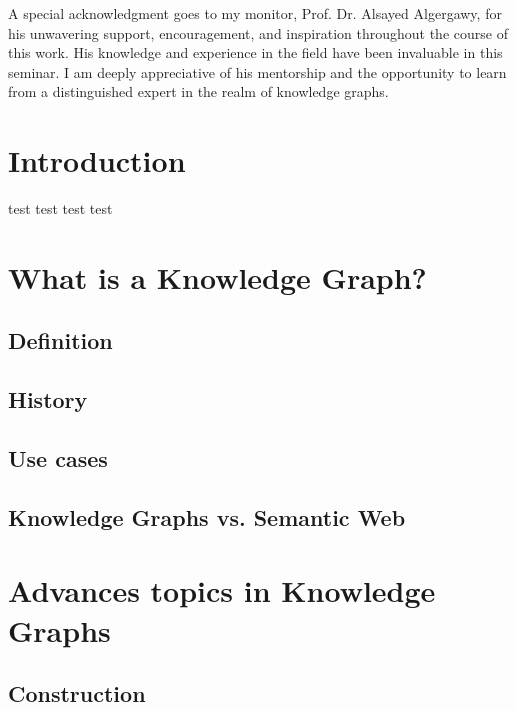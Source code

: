 \documentclass[12pt]{article} %
\begin{document}
A special acknowledgment goes to my monitor, Prof. Dr. Alsayed Algergawy, for his unwavering support, encouragement, and inspiration throughout the course of this work. His knowledge and experience in the field have been invaluable in this seminar. I am deeply appreciative of his mentorship and the opportunity to learn from a distinguished expert in the realm of knowledge graphs.

\newpage

\tableofcontents
\listoffigures
\listoftables
\newpage

\section{Introduction}
test test test test

\section{What is a Knowledge Graph?}

\subsection{Definition}

\subsection{History}

\subsection{Use cases}

\subsection{Knowledge Graphs vs. Semantic Web}


\section{Advances topics in Knowledge Graphs}

\subsection{Construction}
\end{document}
